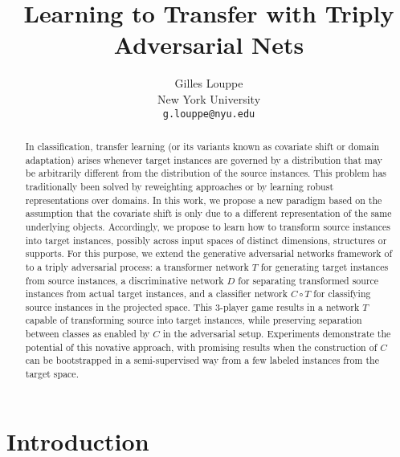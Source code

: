 \documentclass{article}
\title{Learning to Transfer with Triply Adversarial Nets}
\author{
Gilles Louppe \\
New York University\\
\texttt{g.louppe@nyu.edu} \\
}
\begin{document}
\maketitle

\begin{abstract}

In classification, transfer learning (or its variants known as covariate shift
or domain adaptation) arises whenever target instances are governed by a
distribution that may be arbitrarily different from the distribution of the
source instances. This problem has traditionally been solved by reweighting
approaches or by learning robust representations over domains. In this work, we
propose a new paradigm based on the assumption that the covariate shift is only
due to a different representation of the same underlying objects.
Accordingly, we propose to learn how to transform source instances into target
instances, possibly across input spaces of distinct dimensions, structures or
supports. For this purpose, we extend the generative adversarial networks
framework of \cite{goodfellow2014generative} to a triply adversarial process: a
transformer network $T$ for generating target instances from source instances, a
discriminative network $D$ for separating transformed source instances from
actual target instances, and a classifier network $C \circ T$ for classifying source
instances in the projected space. This 3-player game results in a network $T$
capable of transforming source into target instances, while preserving
separation between classes as enabled by $C$ in the adversarial setup.
Experiments demonstrate the potential of this novative approach, with promising
results when the construction of $C$ can be bootstrapped in a semi-supervised
way  from a few labeled instances from the target space.

\end{abstract}

\section{Introduction}


\end{document}
